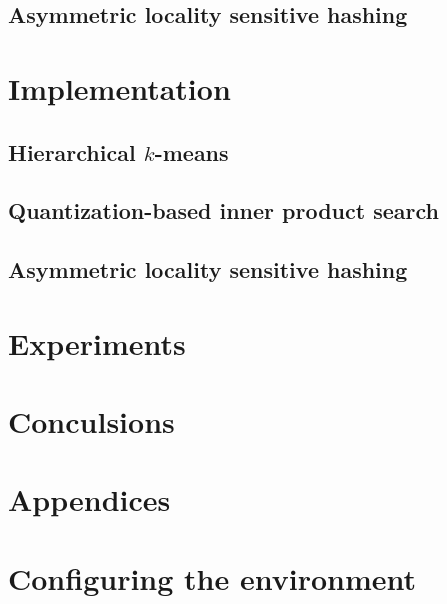\documentclass[12pt]{article}
\begin{document}
	\subsection{Asymmetric locality sensitive hashing}
	
\section{Implementation}
	
	\subsection{Hierarchical $k$-means}
	
	\subsection{Quantization-based inner product search}
	
	\subsection{Asymmetric locality sensitive hashing}
	
\section{Experiments}
	
\section{Conculsions}
	


\newpage
\section{Appendices}
\label{sec:appendices}
\appendix
\section{Configuring the environment}
	
\end{document}
